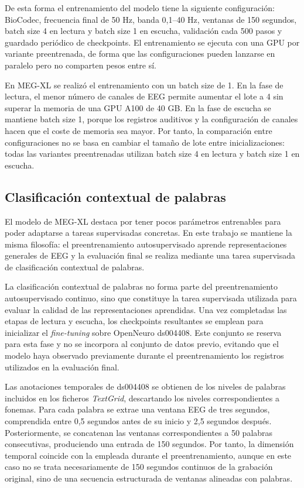 De esta forma el entrenamiento del modelo tiene la siguiente configuración: BioCodec, frecuencia final de 50 Hz, banda 0,1--40 Hz, ventanas de 150 segundos, batch size 4 en lectura y batch size 1 en escucha, validación cada 500 pasos y guardado periódico de checkpoints. El entrenamiento se ejecuta con una GPU por variante preentrenada, de forma que las configuraciones pueden lanzarse en paralelo pero no comparten pesos entre sí.

En MEG-XL se realizó el entrenamiento con un batch size de 1. En la fase de lectura, el menor número de canales de EEG permite aumentar el lote a 4 sin superar la memoria de una GPU A100 de 40 GB. En la fase de escucha se mantiene batch size 1, porque los registros auditivos y la configuración de canales hacen que el coste de memoria sea mayor. Por tanto, la comparación entre configuraciones no se basa en cambiar el tamaño de lote entre inicializaciones: todas las variantes preentrenadas utilizan batch size 4 en lectura y batch size 1 en escucha.

\subsection{Clasificación contextual de palabras}

El modelo de MEG-XL destaca por tener pocos parámetros entrenables para poder adaptarse a tareas supervisadas concretas. En este trabajo se mantiene la misma filosofía: el preentrenamiento autosupervisado aprende representaciones generales de EEG y la evaluación final se realiza mediante una tarea supervisada de clasificación contextual de palabras.

La clasificación contextual de palabras no forma parte del preentrenamiento autosupervisado continuo, sino que constituye la tarea supervisada utilizada para evaluar la calidad de las representaciones aprendidas. Una vez completadas las etapas de lectura y escucha, los checkpoints resultantes se emplean para inicializar el \textit{fine-tuning} sobre OpenNeuro ds004408. Este conjunto se reserva para esta fase y no se incorpora al conjunto de datos previo, evitando que el modelo haya observado previamente durante el preentrenamiento los registros utilizados en la evaluación final.

Las anotaciones temporales de ds004408 se obtienen de los niveles de palabras incluidos en los ficheros \textit{TextGrid}, descartando los niveles correspondientes a fonemas. Para cada palabra se extrae una ventana EEG de tres segundos, comprendida entre 0,5 segundos antes de su inicio y 2,5 segundos después. Posteriormente, se concatenan las ventanas correspondientes a 50 palabras consecutivas, produciendo una entrada de 150 segundos. Por tanto, la dimensión temporal coincide con la empleada durante el preentrenamiento, aunque en este caso no se trata necesariamente de 150 segundos continuos de la grabación original, sino de una secuencia estructurada de ventanas alineadas con palabras.

